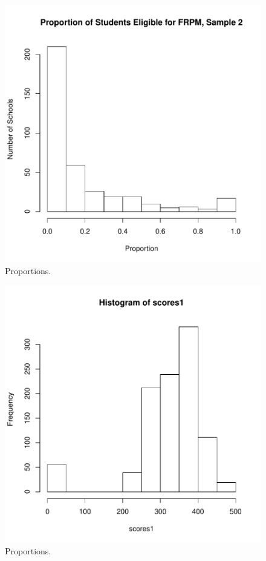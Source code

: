 \documentclass[twocolumn,english]{IEEEtran}
\theoremstyle{plain}
\theoremstyle{plain}
\begin{document}
\begin{figure}[H]
\begin{centering}
\includegraphics{proj3-fig_lunch_props1}
\caption{Proportions.}
\label{fig:Lunch_Hist_One}
\end{centering}
\end{figure}



\begin{figure}[H]
\begin{centering}
\includegraphics{proj3-fig_scores1}
\caption{Proportions.}
\label{fig:Scores_Hist_One}
\end{centering}
\end{figure}
\end{document}
